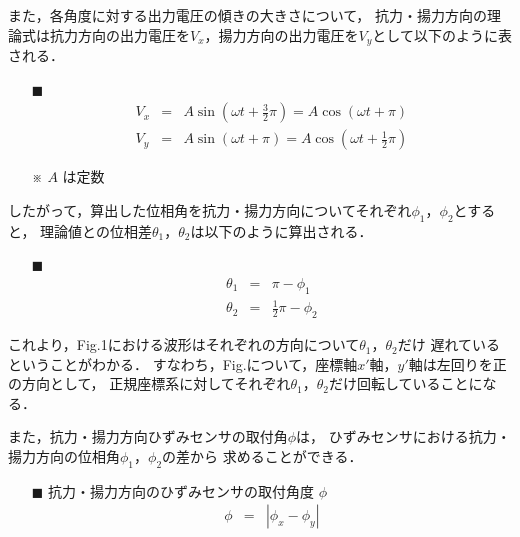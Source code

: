 \documentclass[twocolumn,a4j]{jsarticle}
\begin{document}
また，各角度に対する出力電圧の傾きの大きさについて，
抗力・揚力方向の理論式は抗力方向の出力電圧を$V_{x}$，揚力方向の出力電圧を$V_{y}$として以下のように表される．

\begin{itemize}
    \item [$\blacksquare$] 
          \begin{eqnarray*}
              V_{x} &=& A \sin\left(\omega t + \frac{3}{2}\pi\right) = A \cos\left(\omega t + \pi\right)\\
              V_{y} &=& A \sin\left(\omega t + \pi\right) = A \cos\left(\omega t + \frac{1}{2}\pi\right)
          \end{eqnarray*}
    \item [※] $A$ は定数
\end{itemize}

したがって，算出した位相角を抗力・揚力方向についてそれぞれ$\phi_1$，$\phi_2$とすると，
理論値との位相差$\theta_1$，$\theta_2$は以下のように算出される．

\begin{itemize}
    \item [$\blacksquare$] 
          \begin{eqnarray*}
              \theta_1 &=& \pi - \phi_1\\
              \theta_2 &=& \frac{1}{2} \pi - \phi_2
          \end{eqnarray*}
\end{itemize}

これより，Fig.1における波形はそれぞれの方向について$\theta_1$，$\theta_2$だけ
遅れているということがわかる．
すなわち，Fig.について，座標軸$x'$軸，$y'$軸は左回りを正の方向として，
正規座標系に対してそれぞれ$\theta_1$，$\theta_2$だけ回転していることになる．\par

また，抗力・揚力方向ひずみセンサの取付角$\phi$は，
ひずみセンサにおける抗力・揚力方向の位相角$\phi_1$，$\phi_2$の差から
求めることができる．

\begin{itemize}
    \item [$\blacksquare$] 抗力・揚力方向のひずみセンサの取付角度 $\phi$
          \begin{eqnarray*}
              \phi &=& \left| \phi_x - \phi_y \right| \\
          \end{eqnarray*}
\end{itemize}
\end{document}
